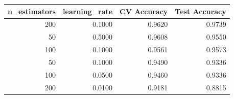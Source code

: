 \begin{tabular}{rrrr}
\toprule
n\_estimators & learning\_rate & CV Accuracy & Test Accuracy \\
\midrule
200 & 0.1000 & 0.9620 & 0.9739 \\
50 & 0.5000 & 0.9608 & 0.9550 \\
100 & 0.1000 & 0.9561 & 0.9573 \\
50 & 0.1000 & 0.9490 & 0.9336 \\
100 & 0.0500 & 0.9460 & 0.9336 \\
200 & 0.0100 & 0.9181 & 0.8815 \\
\bottomrule
\end{tabular}
